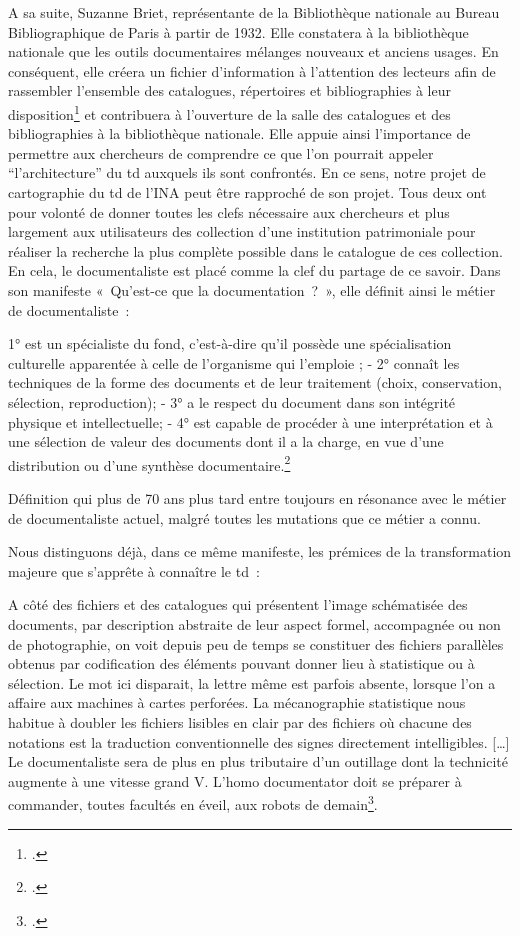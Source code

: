 A sa suite, Suzanne Briet, représentante de la Bibliothèque nationale au Bureau Bibliographique de Paris à partir de 1932. Elle constatera à la bibliothèque nationale que les outils documentaires mélanges nouveaux et anciens usages. En conséquent, elle créera un fichier d’information à l’attention des lecteurs afin de rassembler l’ensemble des catalogues, répertoires et bibliographies à leur disposition\footcite[][129]{fayet-scribe2000} et contribuera à l’ouverture de la salle des catalogues et des bibliographies à la bibliothèque nationale. Elle appuie ainsi l'importance de permettre aux chercheurs de comprendre ce que l'on pourrait appeler \enquote{l'architecture} du \gls{td} auxquels ils sont confrontés. En ce sens, notre projet de cartographie du \gls{td} de l'INA peut être rapproché de son projet. Tous deux ont pour volonté de donner toutes les clefs nécessaire aux chercheurs et plus largement aux utilisateurs des collection d'une institution patrimoniale pour réaliser la recherche la plus complète possible dans le catalogue de ces collection. En cela, le documentaliste est placé comme la clef du partage de ce savoir. Dans son manifeste « Qu’est-ce que la documentation ? », elle définit ainsi le métier de documentaliste : 
\begin{displayquote}
	1° est un spécialiste du fond, c’est-à-dire qu’il possède une spécialisation culturelle apparentée à celle de l’organisme qui l’emploie ; - 2° connaît les techniques de la forme des documents et de leur traitement (choix, conservation, sélection, reproduction); - 3° a le respect du document dans son intégrité physique et intellectuelle; - 4° est capable de procéder à une interprétation et à une sélection de valeur des documents dont il a la charge, en vue d’une distribution ou d’une synthèse documentaire.\footcite[][19]{briet}
\end{displayquote}
Définition qui plus de 70 ans plus tard entre toujours en résonance avec le métier de documentaliste actuel, malgré toutes les mutations que ce métier a connu. 

Nous distinguons déjà, dans ce même manifeste, les prémices de la transformation majeure que s’apprête à connaître le \gls{td} : 
\begin{displayquote}
	A côté des fichiers et des catalogues qui présentent l’image schématisée des documents, par description abstraite de leur aspect formel, accompagnée ou non de photographie, on voit depuis peu de temps se constituer des fichiers parallèles obtenus par codification des éléments pouvant donner lieu à statistique ou à sélection. Le mot ici disparait, la lettre même est parfois absente, lorsque l’on a affaire aux machines à cartes perforées. La mécanographie statistique nous habitue à doubler les fichiers lisibles en clair par des fichiers où chacune des notations est la traduction conventionnelle des signes directement intelligibles. […] Le documentaliste sera de plus en plus tributaire d’un outillage dont la technicité augmente à une vitesse grand V. L’homo documentator doit se préparer à commander, toutes facultés en éveil, aux robots de demain\footcite[][28]{briet}.
\end{displayquote}

